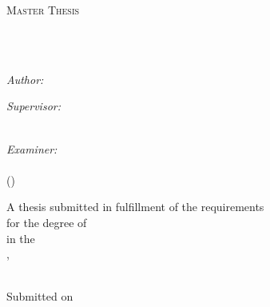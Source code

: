 \hypersetup{pageanchor=false}
\begin{titlepage}
	\begin{center}
		\vspace*{-.06\textheight}
		{\scshape\LARGE \univname\par}\vspace{1.5cm} %
		\textsc{\Large Master Thesis}\\[0.5cm] %
		
		\HRule \\[0.4cm] %
		{\huge \bfseries \ttitle\par}\vspace{0.4cm} %
		\HRule \\[1.5cm] %
		
		\begin{minipage}[t]{0.4\textwidth}
			\begin{flushleft} \large
				\emph{Author:}\\
				{\authorname}
			\end{flushleft}
		\end{minipage}
		\begin{minipage}[t]{0.4\textwidth}
			\begin{flushright} \large
				\emph{Supervisor:} \\
				{\supnames}
			\end{flushright}
		\end{minipage}\\[.7cm]
		{\large
		\emph{Examiner:}\\
		\fExaminer\\
		\sExaminer\:(\uniVienna)}\\[.75cm]
		
		\vfill
		
		\large A thesis submitted in fulfillment of the requirements\\ for the degree of \degreename\\
		in the\\
		\groupname,\\\deptname\\[.5cm]
		
		\vfill
		
		{\large Submitted on \handindate}\\[4cm] %
		
		\vfill
	\end{center}
\end{titlepage}

\thispagestyle{empty}
\newpage
\thispagestyle{empty}

\mbox{}
\thispagestyle{empty}
\newpage
